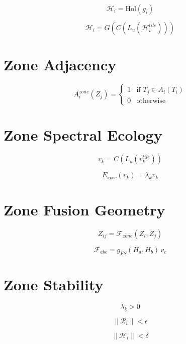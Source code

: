 \[
\mathcal{H}_i = \mathrm{Hol}(g_i)
\]

\[
\mathcal{H}_i = G(C(L_u(\mathcal{H}_i^{tile})))
\]


\section*{Zone Adjacency}

\[
A_i^{zone}(Z_j)
= 
\begin{cases}
1 & \text{if } T_j \in A_i(T_i) \\
0 & \text{otherwise}
\end{cases}
\]


\section*{Zone Spectral Ecology}

\[
v_k = C(L_u(v_k^{tile}))
\]

\[
E_{spec}(v_k) = \lambda_k v_k
\]


\section*{Zone Fusion Geometry}

\[
Z_{ij} = \mathcal{F}_{zone}(Z_i, Z_j)
\]

\[
\mathcal{F}_{abc}
= g_{FS}(H_a, H_b)\, v_c
\]


\section*{Zone Stability}

\[
\lambda_k > 0
\]

\[
\|\mathcal{R}_i\| < \epsilon
\]

\[
\|\mathcal{H}_i\| < \delta
\]

